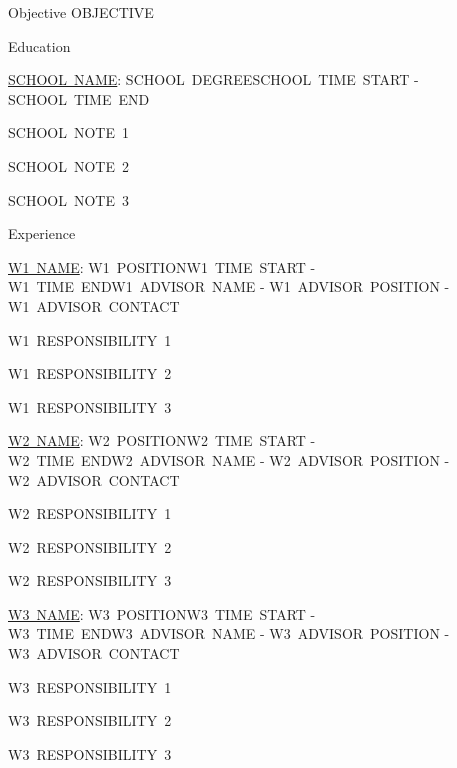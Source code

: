 \documentclass{resume} %
\begin{document}
  \begin{rSection}{Objective}
    OBJECTIVE
  \end{rSection}

  \begin{rSection}{Education}

    \begin{rSubsection}{\underline{SCHOOL~NAME}: SCHOOL~DEGREE}{SCHOOL~TIME~START - SCHOOL~TIME~END}
      \item SCHOOL~NOTE~1
      \item SCHOOL~NOTE~2
      \item SCHOOL~NOTE~3
    \end{rSubsection}

  \end{rSection}

  \begin{rSection}{Experience}

    \begin{rSubsection}{\underline{W1~NAME}: W1~POSITION}{W1~TIME~START - W1~TIME~END}{W1~ADVISOR~NAME - W1~ADVISOR~POSITION - W1~ADVISOR~CONTACT}
      \item W1~RESPONSIBILITY~1
      \item W1~RESPONSIBILITY~2
      \item W1~RESPONSIBILITY~3
    \end{rSubsection}

    \begin{rSubsection}{\underline{W2~NAME}: W2~POSITION}{W2~TIME~START - W2~TIME~END}{W2~ADVISOR~NAME - W2~ADVISOR~POSITION - W2~ADVISOR~CONTACT}
      \item W2~RESPONSIBILITY~1
      \item W2~RESPONSIBILITY~2
      \item W2~RESPONSIBILITY~3
    \end{rSubsection}

    \begin{rSubsection}{\underline{W3~NAME}: W3~POSITION}{W3~TIME~START - W3~TIME~END}{W3~ADVISOR~NAME - W3~ADVISOR~POSITION - W3~ADVISOR~CONTACT}
      \item W3~RESPONSIBILITY~1
      \item W3~RESPONSIBILITY~2
      \item W3~RESPONSIBILITY~3
    \end{rSubsection}

  \end{rSection}
\end{document}
